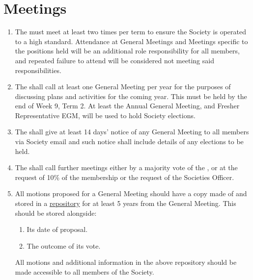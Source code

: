 \documentclass[a4paper,11pt,parskip=half-]{scrartcl} %
\begin{document}
\section{Meetings}
    \begin{enumerate}
        \item The \exec must meet at least two times per term to ensure the Society is operated to a high standard. Attendance at General \exec Meetings and \exec Meetings specific to the positions held will be an additional role responsibility for all \exec members, and repeated failure to attend will be considered not meeting said responsibilities.

        \item The \exec shall call at least one General Meeting per year for the purposes of discussing plans and activities for the coming year. This must be held by the end of Week 9, Term 2. At least the Annual General Meeting, and Fresher Representative EGM, will be used to hold Society \exec elections.

        \item The \exec shall give at least 14 days' notice of any General Meeting to all members via Society email and such notice shall include details of any elections to be held.

        \item The \exec shall call further meetings either by a majority  vote of the \exec, or at the request of 10\% of the membership or the request of the Societies Officer.

        \item All motions proposed for a General Meeting should have a copy made of and stored in a \href{https://github.com/uwcs/democracy}{repository} for at least 5 years from the General Meeting. This should be stored alongside:
            \begin{enumerate}
                \item Its date of proposal.
                \item The outcome of its vote.
            \end{enumerate}
            All motions and additional information in the above repository should be made accessible to all members of the Society.
    \end{enumerate}
\end{document}
